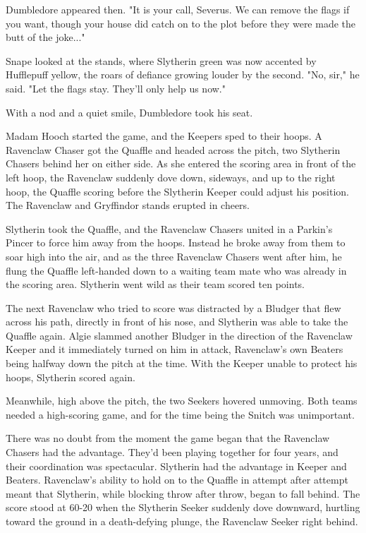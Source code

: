 Dumbledore appeared then. "It is your call, Severus. We can remove the flags if you want, though your house did catch on to the plot before they were made the butt of the joke..."

Snape looked at the stands, where Slytherin green was now accented by Hufflepuff yellow, the roars of defiance growing louder by the second. "No, sir," he said. "Let the flags stay. They'll only help us now."

With a nod and a quiet smile, Dumbledore took his seat.

Madam Hooch started the game, and the Keepers sped to their hoops. A Ravenclaw Chaser got the Quaffle and headed across the pitch, two Slytherin Chasers behind her on either side. As she entered the scoring area in front of the left hoop, the Ravenclaw suddenly dove down, sideways, and up to the right hoop, the Quaffle scoring before the Slytherin Keeper could adjust his position. The Ravenclaw and Gryffindor stands erupted in cheers.

Slytherin took the Quaffle, and the Ravenclaw Chasers united in a Parkin's Pincer to force him away from the hoops. Instead he broke away from them to soar high into the air, and as the three Ravenclaw Chasers went after him, he flung the Quaffle left-handed down to a waiting team mate who was already in the scoring area. Slytherin went wild as their team scored ten points.

The next Ravenclaw who tried to score was distracted by a Bludger that flew across his path, directly in front of his nose, and Slytherin was able to take the Quaffle again. Algie slammed another Bludger in the direction of the Ravenclaw Keeper and it immediately turned on him in attack, Ravenclaw's own Beaters being halfway down the pitch at the time. With the Keeper unable to protect his hoops, Slytherin scored again.

Meanwhile, high above the pitch, the two Seekers hovered unmoving. Both teams needed a high-scoring game, and for the time being the Snitch was unimportant.

There was no doubt from the moment the game began that the Ravenclaw Chasers had the advantage. They'd been playing together for four years, and their coordination was spectacular. Slytherin had the advantage in Keeper and Beaters. Ravenclaw's ability to hold on to the Quaffle in attempt after attempt meant that Slytherin, while blocking throw after throw, began to fall behind. The score stood at 60-20 when the Slytherin Seeker suddenly dove downward, hurtling toward the ground in a death-defying plunge, the Ravenclaw Seeker right behind.

